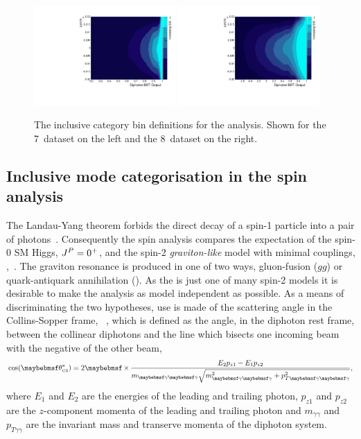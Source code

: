 \begin{figure}
  \includegraphics[width=0.48\textwidth]{selec_and_cats/plots/sideband_cats_7TeV_fix.pdf}
  \includegraphics[width=0.48\textwidth]{selec_and_cats/plots/sideband_cats_8TeV_fix.pdf}
  \caption[The inclusive category bin definitions for the \acs{SMVA} analysis]{The inclusive category bin definitions for the \SMVA analysis. Shown for the 7~\TeV dataset on the left and the 8~\TeV dataset on the right.}
  \label{fig:sideband_cats}
\end{figure}

\subsection{Inclusive mode categorisation in the spin analysis}
\label{sec:spin_cats}

The Landau-Yang theorem forbids the direct decay of a spin-1 particle into a pair of photons~\cite{Landau1948,Yang1950}. 
Consequently the spin analysis compares the expectation of the spin-0 SM Higgs, $J^{P}=0^{+}$, and the spin-2 \emph{graviton-like} 
model with minimal couplings, \twomp,~\cite{Gao2010}. The \twomp graviton resonance is produced in one of two ways, gluon-fusion ($gg$) 
or quark-antiquark annihilation (\qqbar). As the \twomp is just one of many spin-2 models it is desirable to make the analysis as model independent as possible. As a means of 
discriminating the two hypotheses, use is made of the scattering angle in the Collins-Sopper frame, \costhetastar ~\cite{CollinsSoper1977}, which is defined as the angle, in the diphoton rest frame, between the collinear diphotons 
and the line which bisects one incoming beam with the negative of the other beam, 
\begin{equation}
  \cos(\theta^{\ast}_{\mbox{\tiny{CS}}}) = 2\times\frac{E_{2}p_{z1}-E_{1}p_{z2}}{m_{\gamma\gamma}\sqrt{m^{2}_{\gamma\gamma}+p^{2}_{T\gamma\gamma}}},
  \label{eq:costheta}
\end{equation}
where $E_{1}$ and $E_{2}$ are the energies of the leading and trailing photon, $p_{z1}$ and $p_{z2}$ are the $z$-component momenta 
of the leading and trailing photon and $m_{\gamma\gamma}$ and $p_{T\gamma\gamma}$ are the invariant mass and transerve momenta of the diphoton system.

